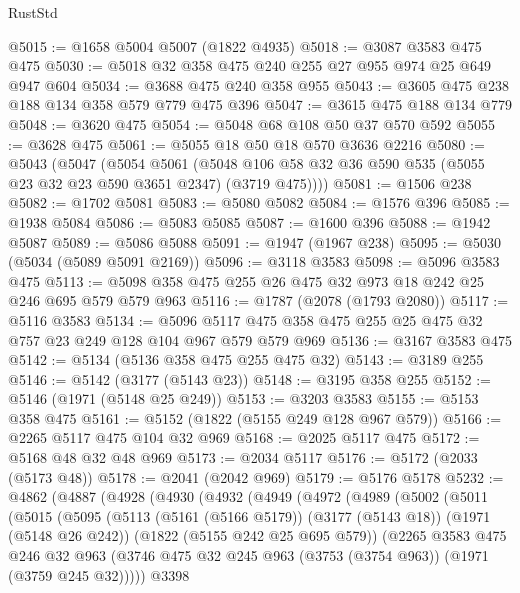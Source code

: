 \begin{lexlean}{RustStd}
\begin{coremodule}
@5015 := @1658 @5004 @5007 (@1822 @4935)
@5018 := @3087 @3583 @475 @475
@5030 := @5018 @32 @358 @475 @240 @255 @27 @955 @974 @25 @649 @947 @604
@5034 := @3688 @475 @240 @358 @955
@5043 := @3605 @475 @238 @188 @134 @358 @579 @779 @475 @396
@5047 := @3615 @475 @188 @134 @779
@5048 := @3620 @475
@5054 := @5048 @68 @108 @50 @37 @570 @592
@5055 := @3628 @475
@5061 := @5055 @18 @50 @18 @570 @3636 @2216
@5080 := @5043
    (@5047
      (@5054
        @5061
        (@5048 @106 @58 @32 @36 @590 @535 (@5055 @23 @32 @23 @590 @3651 @2347) (@3719 @475))))
@5081 := @1506 @238
@5082 := @1702 @5081
@5083 := @5080 @5082
@5084 := @1576 @396
@5085 := @1938 @5084
@5086 := @5083 @5085
@5087 := @1600 @396
@5088 := @1942 @5087
@5089 := @5086 @5088
@5091 := @1947 (@1967 @238)
@5095 := @5030 (@5034 (@5089 @5091 @2169))
@5096 := @3118 @3583
@5098 := @5096 @3583 @475
@5113 := @5098 @358 @475 @255 @26 @475 @32 @973 @18 @242 @25 @246 @695 @579 @579 @963
@5116 := @1787 (@2078 (@1793 @2080))
@5117 := @5116 @3583
@5134 := @5096 @5117 @475 @358 @475 @255 @25 @475 @32 @757 @23 @249 @128 @104 @967 @579 @579 @969
@5136 := @3167 @3583 @475
@5142 := @5134 (@5136 @358 @475 @255 @475 @32)
@5143 := @3189 @255
@5146 := @5142 (@3177 (@5143 @23))
@5148 := @3195 @358 @255
@5152 := @5146 (@1971 (@5148 @25 @249))
@5153 := @3203 @3583
@5155 := @5153 @358 @475
@5161 := @5152 (@1822 (@5155 @249 @128 @967 @579))
@5166 := @2265 @5117 @475 @104 @32 @969
@5168 := @2025 @5117 @475
@5172 := @5168 @48 @32 @48 @969
@5173 := @2034 @5117
@5176 := @5172 (@2033 (@5173 @48))
@5178 := @2041 (@2042 @969)
@5179 := @5176 @5178
@5232 := @4862
    (@4887
      (@4928
        (@4930
          (@4932
            (@4949
              (@4972
                (@4989
                  (@5002
                    (@5011
                      (@5015
                        (@5095
                          (@5113
                            (@5161 (@5166 @5179))
                            (@3177 (@5143 @18))
                            (@1971 (@5148 @26 @242))
                            (@1822 (@5155 @242 @25 @695 @579))
                            (@2265
                              @3583
                              @475
                              @246
                              @32
                              @963
                              (@3746
                                @475
                                @32
                                @245
                                @963
                                (@3753 (@3754 @963))
                                (@1971 (@3759 @245 @32)))))
                          @3398

\end{coremodule}
\end{lexlean}
